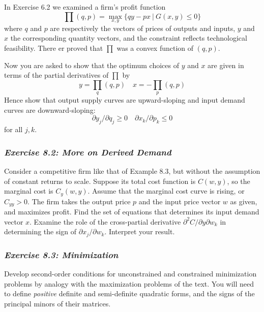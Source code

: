 In Exercise 6.2 we examined a firm's profit function
\begin{equation*}   
  \prod (q,p) = \max\limits_{x,y}  \{ qy -px \ | \ G(x,y) \leq 0 \}
\end{equation*}
where $q$ and $p$ are respectively the vectors of prices of outputs and inputs, $y$ and $x$ the corresponding quantity vectors, and the constraint reflects technological feasibility. There er proved that $\prod$ was a convex function of $(q,p)$.

Now you are asked to show that the optimum choices of $y$ and $x$ are given in terms of the partial derivatives of $\prod$ by
\begin{equation*}   
 y = \prod_q (q,p)   \quad x = -\prod_p(q,p)
\end{equation*}
Hence show that output supply curves are upward-sloping and input demand curves are downward-sloping:
\begin{equation*}   
  \partial y_j / \partial q_j \geq 0  \quad  \partial x_k / \partial p_k \leq 0
\end{equation*}
for all $j, k$.

\subsubsection*{\textit{Exercise 8.2: More on Derived Demand}}

Consider a competitive firm like that of Example 8.3, but without the assumption of constant returns to scale. Suppose its total cost function is $C(w,y)$, so the marginal cost is $C_y(w,y)$. Assume that the marginal cost curve is rising, or $C_{yy} >0$. The firm takes the output price $p$ and the input price vector $w$ as given, and maximizes profit. Find the set of equations that determines its input demand vector $x$. Examine the role of the cross-partial derivative $\partial ^2 C / \partial y \partial w_k$ in determining the sign of $\partial x_j / \partial w_k$. Interpret your result.

\subsubsection*{\textit{Exercise 8.3: Minimization}}

Develop second-order conditions for unconstrained and constrained minimization problems by analogy with the maximization problems of the text. You will need to define \textit{positive} definite and semi-definite quadratic forms, and the signs of the principal minors of their matrices.







